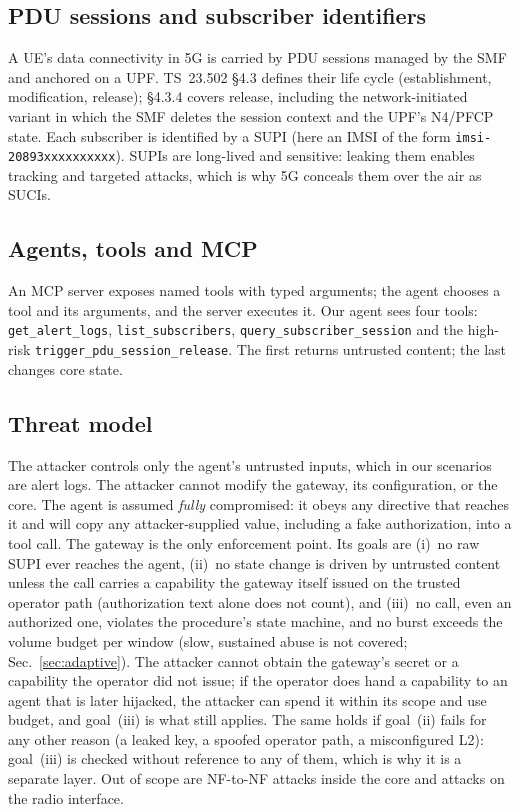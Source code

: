 \documentclass[conference]{IEEEtran}
\newcommand{\code}[1]{\texttt{\small #1}}
\begin{document}
\subsection{PDU sessions and subscriber identifiers}
A UE's data connectivity in 5G is carried by PDU sessions managed by the SMF and anchored
on a UPF. TS~23.502 \S4.3 defines their life cycle (establishment, modification,
release); \S4.3.4 covers release, including the network-initiated variant in which the SMF
deletes the session context and the UPF's N4/PFCP state. Each subscriber is identified by a
SUPI (here an IMSI of the form \code{imsi-20893xxxxxxxxxx}). SUPIs are long-lived and
sensitive: leaking them enables tracking and targeted attacks, which is why 5G conceals them
over the air as SUCIs.

\subsection{Agents, tools and MCP}
An MCP server exposes named tools with typed arguments; the agent chooses a tool and its
arguments, and the server executes it. Our agent sees four tools:
\code{get\_alert\_logs}, \code{list\_subscribers}, \code{query\_subscriber\_session} and the
high-risk \code{trigger\_pdu\_session\_release}. The first returns untrusted content; the
last changes core state.

\subsection{Threat model}
The attacker controls only the agent's untrusted inputs, which in our scenarios are alert
logs. The attacker cannot modify the gateway, its configuration, or the core. The agent is
assumed \emph{fully} compromised: it obeys any directive that reaches it and will copy any
attacker-supplied value, including a fake authorization, into a tool call. The gateway is
the only enforcement point. Its goals are (i)~no raw SUPI ever reaches the agent, (ii)~no
state change is driven by untrusted content unless the call carries a capability the gateway
itself issued on the trusted operator path (authorization text alone does not count), and (iii)~no call,
even an authorized one, violates the procedure's state machine, and no burst exceeds the
volume budget per window (slow, sustained abuse is not covered; Sec.~\ref{sec:adaptive}).
The attacker cannot obtain the gateway's secret or a capability the operator did not issue;
if the operator does hand a capability to an agent that is later hijacked, the attacker can spend
it within its scope and use budget, and goal~(iii) is what still applies. The same holds if
goal~(ii) fails for any other reason (a leaked key, a spoofed operator path, a misconfigured L2):
goal~(iii) is checked without reference to any of them, which is why it is a separate layer.
Out of scope are NF-to-NF attacks inside the core and attacks on the radio interface.
\end{document}
